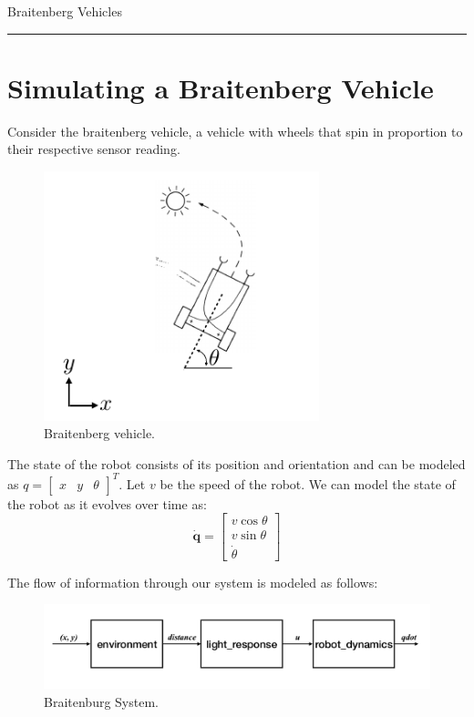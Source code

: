 \documentclass[12pt]{article}
\begin{document}
    \begin{flushleft}
	\LARGE Braitenberg Vehicles
    \end{flushleft} 
    \rule{\linewidth}{0.4pt}


    \section*{Simulating a Braitenberg Vehicle}

	Consider the braitenberg vehicle, a vehicle with wheels that spin in proportion to their respective sensor reading.

	\begin{figure}[h]
		\includegraphics[width=8cm]{./figure1.png}
		\centering
		\caption{Braitenberg vehicle.}
	\end{figure}

	\noindent The state of the robot consists of its position and orientation and can be modeled as \newline $q = \begin{bmatrix} x & y & \theta \end{bmatrix}^T$.
	Let $v$ be the speed of the robot. We can model the state of the robot as it evolves over time as:
	\begin{equation}
		\pmb{\dot q} = \begin{bmatrix} v\cos{\theta} \\ v\sin{\theta} \\ \dot{\theta} \end{bmatrix}
	\end{equation}

	The flow of information through our system is modeled as follows:

	\begin{figure}[H]
		\includegraphics[width=14cm]{./figure2.png}
		\centering
		\caption{Braitenburg System.}
	\end{figure}
\end{document}
